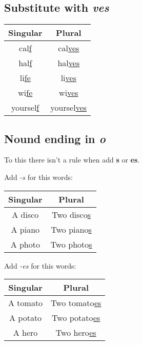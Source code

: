 \documentclass{elegantbook}
\begin{document}
    \subsection{Substitute with \emph{ves}}
    \begin{center}
        \begin{tabular}{c|c}
            \textbf{Singular}&\textbf{Plural}\\
            \hline
            cal\underline{f}&cal\underline{ves}\\
            hal\underline{f}&hal\underline{ves}\\
            li\underline{fe}&li\underline{ves}\\
            wi\underline{fe}&wi\underline{ves}\\
            yoursel\underline{f}&yoursel\underline{ves}
        \end{tabular}
    \end{center}
    \subsection{Nound ending in \emph{o}}
    \begin{note}
        To this there isn't a rule when add \textbf{s} or \textbf{es}.
    \end{note}
    \begin{property}
        Add \emph{-s} for this words:
    \end{property}
    \begin{center}
        \begin{tabular}{c|c}
            \textbf{Singular}&\textbf{Plural}\\
            \hline
            A disco&Two disco\underline{s}\\
            A piano&Two piano\underline{s}\\
            A photo&Two photo\underline{s}\\
        \end{tabular}
    \end{center}
    \begin{property}
        Add \emph{-es} for this words:
    \end{property}
    \begin{center}
        \begin{tabular}{c|c}
            \textbf{Singular}&\textbf{Plural}\\
            \hline
            A tomato&Two tomato\underline{es}\\
            A potato&Two potato\underline{es}\\
            A hero&Two hero\underline{es}\\
        \end{tabular}
    \end{center}
\end{document}
